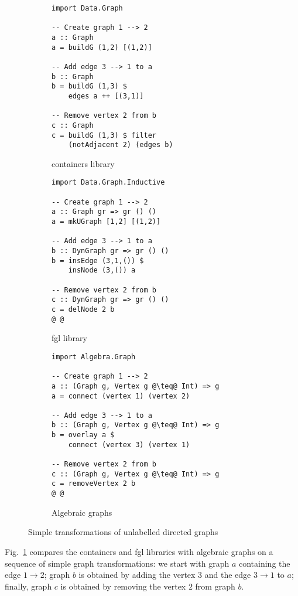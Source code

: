 \documentclass[acmlarge,anonymous]{acmart}\settopmatter{printfolios=true}
\begin{document}
\begin{figure}
\begin{subfigure}[b]{0.28\linewidth}
\begin{verbatim}
import Data.Graph

-- Create graph 1 --> 2
a :: Graph
a = buildG (1,2) [(1,2)]

-- Add edge 3 --> 1 to a
b :: Graph
b = buildG (1,3) $
    edges a ++ [(3,1)]

-- Remove vertex 2 from b
c :: Graph
c = buildG (1,3) $ filter
    (notAdjacent 2) (edges b)
\end{verbatim}
\caption{\textsf{containers} library}
\end{subfigure}
\hfill
\hfill
\vrule
\hfill
\hfill
\begin{subfigure}[b]{0.3\linewidth}
\begin{verbatim}
import Data.Graph.Inductive

-- Create graph 1 --> 2
a :: Graph gr => gr () ()
a = mkUGraph [1,2] [(1,2)]

-- Add edge 3 --> 1 to a
b :: DynGraph gr => gr () ()
b = insEdge (3,1,()) $
    insNode (3,()) a

-- Remove vertex 2 from b
c :: DynGraph gr => gr () ()
c = delNode 2 b
@ @
\end{verbatim}
\caption{\textsf{fgl} library}
\end{subfigure}
\hfill
\vrule
\hfill
\hfill
\begin{subfigure}[b]{0.35\linewidth}
\begin{verbatim}
import Algebra.Graph

-- Create graph 1 --> 2
a :: (Graph g, Vertex g @\teq@ Int) => g
a = connect (vertex 1) (vertex 2)

-- Add edge 3 --> 1 to a
b :: (Graph g, Vertex g @\teq@ Int) => g
b = overlay a $
    connect (vertex 3) (vertex 1)

-- Remove vertex 2 from b
c :: (Graph g, Vertex g @\teq@ Int) => g
c = removeVertex 2 b
@ @
\end{verbatim}
\caption{Algebraic graphs}
\end{subfigure}
\caption{Simple transformations of unlabelled directed graphs\label{fig-example}}
\vspace{-4mm}
\end{figure}

Fig.~\ref{fig-example} compares the \textsf{containers} and
\textsf{fgl} libraries with algebraic graphs on a sequence of
simple graph transformations: we start with graph $a$ containing the
edge $1 \rightarrow 2$; graph $b$ is obtained by adding the vertex $3$
and the edge $3 \rightarrow 1$ to $a$; finally, graph $c$ is obtained by removing
the vertex $2$ from graph $b$.
\end{document}

